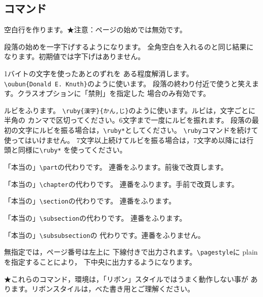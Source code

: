 \documentclass{jarticle}
\begin{document}
\subsection{コマンド}
\begin{biao}[　　　　　　　　]
\item[$\backslash$空行]空白行を作ります。★注意：ページの始めでは無効です。
\item[$\backslash$一字下げ]段落の始めを一字下げするようになります。
全角空白を入れるのと同じ結果になります。初期値では字下げはありません。
\item[$\backslash$oubun]1バイトの文字を使ったあとのずれを
ある程度解消します。\\
\verb+\oubun{Donald E. Knuth}+のように使います。
段落の終わり付近で使うと笑えます。クラスオプションに「禁則」を指定した
場合のみ有効です。
\item[$\backslash$ruby]ルビをふります。
\verb+\ruby{漢字}{かん,じ}+のように使います。ルビは，文字ごとに半角の
カンマで区切ってください。6文字まで一度にルビを振れます。
段落の最初の文字にルビを振る場合は，\verb+\ruby*+としてください。
\verb+\ruby+コマンドを続けて使ってはいけません。
7文字以上続けてルビを振る場合は，7文字め以降には行頭と同様に\verb+\ruby*+
を使ってください。
\item[$\backslash$part]「本当の」\verb+\part+の代わりです。
連番をふります。前後で改頁します。
\item[$\backslash$chapter]「本当の」\verb+\chapter+の代わりです。
連番をふります。手前で改頁します。
\item[$\backslash$section]「本当の」\verb+\section+の代わりです。
連番をふります。
\item[$\backslash$subsection]「本当の」\verb+\subsection+の代わりです。
連番をふります。
\item[$\backslash$subsubsection]「本当の」\verb+\subsubsection+の
代わりです。連番をふりません。
\item[$\backslash$pagestyle]無指定では，ページ番号は左上に
下線付きで出力されます。\verb+\pagestyle+に plain を指定することにより，
下中央に出力するようになります。
\end{biao}
★これらのコマンド，環境は，「リボン」スタイルではうまく動作しない事が
あります。リボンスタイルは，べた書き用とご理解ください。
\end{document}
